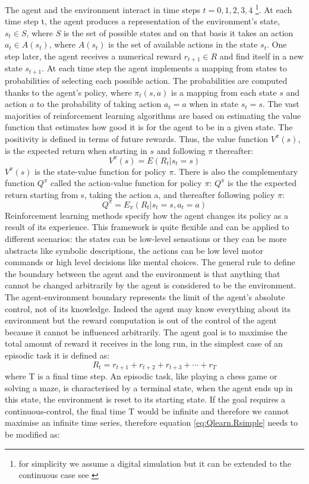 The agent and the environment interact in time steps $t=0,1,2,3,4$
\footnote{for simplicity we assume a digital simulation but it can be extended
to the continuous case see \citep{TDrealtime}}.
At each time step t, the agent produces a representation of the environment's state,
$s_t \in S$, where  $S$
is the set of possible states and on that basis it takes an action $a_t \in A(s_t)$,
where $A(s_t)$ is the set of available actions in the state $s_t$.
One step later, the agent receives a numerical reward $r_{t+1}\in R$ and
find itself in a new state $s_{t+1}$.
At each time step the agent implements a mapping from states to probabilities
of selecting each possible action. The probabilities are
computed thanks to the agent's policy, where $\pi_t(s,a)$ is a mapping from
each state $s$ and action $a$ to the probability
of taking action  $a_t=a$ when in state $s_t=s$.
The vast majorities of reinforcement learning algorithms are based on estimating
the value function that estimates
how good it is for the agent to be in a given state. The positivity is defined in
terms of future rewards.
Thus, the value function $V^{\pi}(s)$, is the expected return when starting in
$s$ and following $\pi$ thereafter:
\begin{equation}
 V^\pi(s)=E{(R_t|s_t=s)}
\end{equation}
$V^{\pi}(s)$ is the state-value function for policy $\pi$.
There is also the complementary function $Q^\pi$ called the action-value function
for policy $\pi$: $Q^\pi$ is the the expected
 return starting from s, taking the action a, and thereafter following policy $\pi$:
\begin{equation}
 Q^\pi=E_{\pi}({R_t|s_t=s,a_t=a})
\end{equation}
Reinforcement learning methods specify how the agent changes its policy
as a result of its experience.
This framework is quite flexible and can be applied to different scenarios:
the states can be low-level sensations or they can be more
 abstracts like symbolic descriptions, the actions can be low level motor
commands or high level decisions like mental choices.
The general rule to define the boundary between the agent and the environment
is that anything that cannot be changed arbitrarily
by the agent is considered to be the environment.
The agent-environment boundary represents the limit of the agent's absolute control,
not of its knowledge. Indeed the agent may know
everything about its environment but the reward computation is out of the control
of the agent because it cannot be influenced arbitrarily.
The agent goal is to maximise the total amount of reward it receives in
the long run, in the simplest case of an
episodic task it is defined as:
\begin{equation}
 R_t=r_{t+1}+r_{t+2}+r_{t+3}+\cdots +r_T \label{eq:Qlearn.Rsimple}
\end{equation}
where T is a final time step. An episodic task, like playing a chess game
or solving a maze, is characterised by a terminal state, when
the agent ends up in this state, the environment is reset to its starting state.
If the goal requires a continuous-control, the final time T would be infinite and
therefore we cannot maximise an infinite time series,
therefore equation \ref{eq:Qlearn.Rsimple} needs to be modified as:

